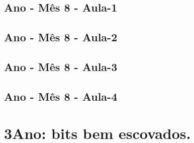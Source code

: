 \begin{multicols}{2}
\section[\sffamily 2\textordmasculine\space Ano - M\^{e}s 8 - Aula-1]{\textordmasculine\space Ano - M\^{e}s 8 - Aula-1}


\section[\sffamily 2\textordmasculine\space Ano - M\^{e}s 8 - Aula-2]{\textordmasculine\space Ano - M\^{e}s 8 - Aula-2}


\section[\sffamily 2\textordmasculine\space Ano - M\^{e}s 8 - Aula-3]{\textordmasculine\space Ano - M\^{e}s 8 - Aula-3}


\section[\sffamily 2\textordmasculine\space Ano - M\^{e}s 8 - Aula-4]{\textordmasculine\space Ano - M\^{e}s 8 - Aula-4}


\end{multicols}
\vfill\null
\pagebreak


\color{white}

\chapter[ 3\textordmasculine\space Ano: bits bem escovados.]{3\textordmasculine\space Ano: bits bem escovados.}\label{chap5}

\pagebreak
\ClearWallPaper
\color{black}



\pagebreak

